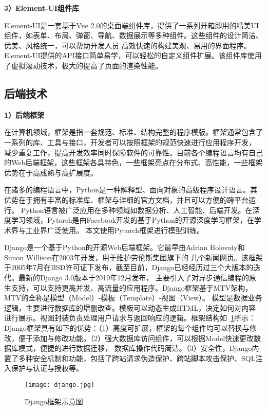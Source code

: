 \textbf{3）Element-UI组件库}

Element-UI是一套基于Vue 2.0的桌面端组件库，提供了一系列开箱即用的精美UI组件，如表单、布局、弹窗、导航、数据展示等多种组件。这些组件的设计简洁、优美、风格统一，可以帮助开发人员 
高效快速的构建美观、易用的界面程序。Element-UI提供的API接口简单易学，可以轻松的自定义组件扩展。该组件库使用了虚拟滚动技术，极大的提高了页面的渲染性能。

\subsection{后端技术}

\textbf{1）后端框架}

在计算机领域，框架是指一套规范、标准、结构完整的程序模版。框架通常包含了一系列的库、工具与接口，开发者可以按照框架的规范快速进行应用程序开发，
减少重复工作，提高开发效率同时保障软件的可靠性。目前各个编程语言均有自己的Web后端框架，这些框架各具特色，一些框架亮点在分布式、高性能，一些框架优势在于高成熟与高扩展度。

在诸多的编程语言中，Python是一种解释型、面向对象的高级程序设计语言。其优势在于拥有丰富的标准库、框架与详细的官方文档，并且可以方便的跨平台运行。
Python语言被广泛应用在多种领域如数据分析、人工智能、后端开发。在深度学习领域，Pytorch是由Facebook开发的基于Python的开源深度学习框架，在学术界与工业界广泛使用。
本文使用Pytorch框架进行模型训练。

Django\cite{rubio2017beginning}是一个基于Python的开源Web后端框架。它最早由Adrian Holovaty和Simon Willison在2003年开发，用于维护劳伦斯集团旗下的
几个新闻网页。该框架于2005年7月在BSD许可证下发布，截至目前，Django已经经历过三个大版本的迭代。最新的Django 3.0版本于2019年12月发布，
主要引入了对异步通信编程的原生支持，可以支持更高并发、高流量的应用程序。Django框架基于MTV架构，MTV的全称是模型（Model）-模板（Template）-视图（View）。
模型是数据业务逻辑，主要进行数据库的增删改查。模板可以动态生成HTML，决定如何对内容进行展示。视图封装负责处理用户请求与返回响应的逻辑。框架结构如~\ref{fig:django}所示：
Django框架具有如下的优势：（1）高度可扩展，框架的每个组件均可以替换与修改，便于添加与修改功能。（2）强大数据库访问组件，可以根据Model快速更改数据库模式，便捷的进行数据迁移，
数据库操作代码简洁。（3）安全性，Django内置了多种安全机制和功能，包括了跨站请求伪造保护、跨站脚本攻击保护、SQL注入保护与认证与授权等。

\begin{figure}[htbp]
  \centering
  \texttt{[image: django.jpg]}
  \caption{Django框架示意图}
  \label{fig:django}
\end{figure}



